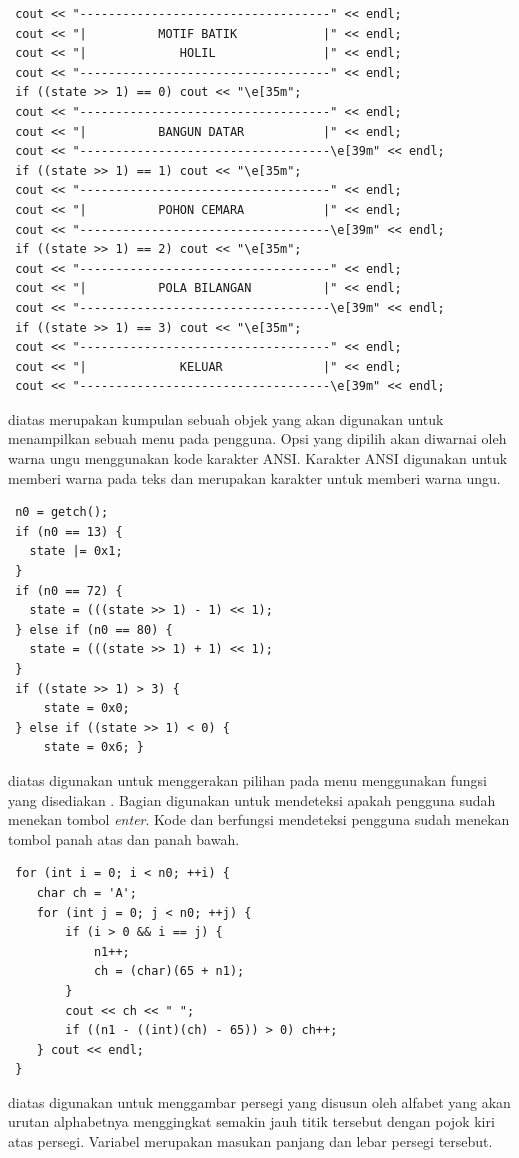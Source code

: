 \documentclass[../main.tex]{subfiles}
\begin{document}
\begin{lstlisting}
 cout << "-----------------------------------" << endl;
 cout << "|          MOTIF BATIK            |" << endl;
 cout << "|             HOLIL               |" << endl;
 cout << "-----------------------------------" << endl;
 if ((state >> 1) == 0) cout << "\e[35m";
 cout << "-----------------------------------" << endl;
 cout << "|          BANGUN DATAR           |" << endl;
 cout << "-----------------------------------\e[39m" << endl;
 if ((state >> 1) == 1) cout << "\e[35m";
 cout << "-----------------------------------" << endl;
 cout << "|          POHON CEMARA           |" << endl;
 cout << "-----------------------------------\e[39m" << endl;
 if ((state >> 1) == 2) cout << "\e[35m";
 cout << "-----------------------------------" << endl;
 cout << "|          POLA BILANGAN          |" << endl;
 cout << "-----------------------------------\e[39m" << endl;
 if ((state >> 1) == 3) cout << "\e[35m";
 cout << "-----------------------------------" << endl;
 cout << "|             KELUAR              |" << endl;
 cout << "-----------------------------------\e[39m" << endl;
\end{lstlisting}
    \ilz{}{\Script} diatas merupakan kumpulan sebuah objek  yang akan digunakan untuk menampilkan sebuah menu pada pengguna. Opsi yang dipilih akan diwarnai oleh warna ungu menggunakan kode karakter ANSI. Karakter ANSI \inputscript{\textbackslash e[3xm} digunakan untuk memberi warna pada teks dan \inputscript{\textbackslash e[39m} merupakan karakter untuk memberi warna ungu.

\begin{lstlisting}
 n0 = getch();
 if (n0 == 13) {
   state |= 0x1;
 }
 if (n0 == 72) {
   state = (((state >> 1) - 1) << 1);
 } else if (n0 == 80) {
   state = (((state >> 1) + 1) << 1);
 }
 if ((state >> 1) > 3) {
     state = 0x0;
 } else if ((state >> 1) < 0) {
     state = 0x6; }
\end{lstlisting}
    \ilz{}{\Script} diatas digunakan untuk menggerakan pilihan pada menu menggunakan fungsi  yang disediakan {\header} {\file} . Bagian  digunakan untuk mendeteksi apakah pengguna sudah menekan tombol \textit{enter}. Kode  dan  berfungsi mendeteksi pengguna sudah menekan tombol panah atas dan panah bawah.

\begin{lstlisting}
 for (int i = 0; i < n0; ++i) {
 	char ch = 'A';
 	for (int j = 0; j < n0; ++j) {
 		if (i > 0 && i == j) {
 			n1++;
 			ch = (char)(65 + n1);
 		}
        cout << ch << " ";
 		if ((n1 - ((int)(ch) - 65)) > 0) ch++;
 	} cout << endl;
 }
\end{lstlisting}
    \vspace{-0.25ex}
    \ilz{}{\Script} diatas digunakan untuk menggambar persegi yang disusun oleh alfabet yang akan urutan alphabetnya menggingkat semakin jauh titik tersebut dengan pojok kiri atas persegi. Variabel  merupakan masukan panjang dan lebar persegi tersebut.
\end{document}
